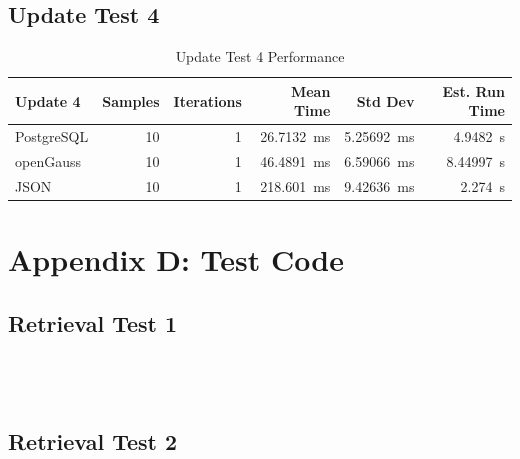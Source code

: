 \documentclass[14pt,a4paper]{article}
\begin{document}
    \subsection{Update Test 4}
    
    \begin{table}[H]
        \centering        
        \begin{tabular}{lrrrrr}
            \toprule
            \textbf{Update 4} & \textbf{Samples} & \textbf{Iterations} & \textbf{Mean Time} & \textbf{Std Dev} & \textbf{Est. Run Time} \\
            \midrule
            PostgreSQL & 10 & 1 & \qty{26.7132}{\milli\second} & \qty{5.25692}{\milli\second} & \qty{4.9482}{\second} \\
            openGauss & 10 & 1 & \qty{46.4891}{\milli\second} & \qty{6.59066}{\milli\second} & \qty{8.44997}{\second} \\
            JSON & 10 & 1 & \qty{218.601}{\milli\second} & \qty{9.42636}{\milli\second} & \qty{2.274}{\second} \\
            \bottomrule
        \end{tabular}
        \caption{Update Test 4 Performance}
    \end{table}
    
    \section{Appendix D: Test Code}
    \subsection{Retrieval Test 1}
    
    \inputminted[bgcolor=LightGray,breaklines,breakafter=d]{cpp}{ret_test_1_pg.cpp}
    
    \inputminted[bgcolor=LightGray,breaklines,breakafter=d]{cpp}{ret_test_1_og.cpp}
    
    \inputminted[bgcolor=LightGray,breaklines,breakafter=d]{cpp}{ret_test_1_js.cpp}
    
    \inputminted[bgcolor=LightGray,breaklines,breakafter=d]{cpp}{ret_test_1_be.cpp}
    
    \subsection{Retrieval Test 2}
    
    \inputminted[bgcolor=LightGray,breaklines,breakafter=d]{cpp}{ret_test_2_pg.cpp}
    
\end{document}
